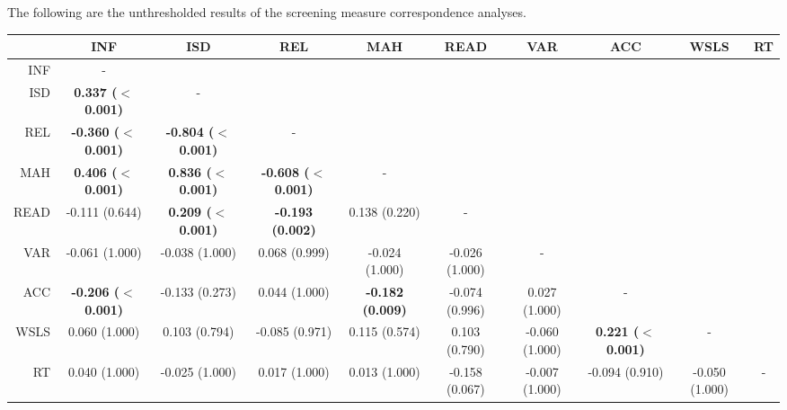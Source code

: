 \documentclass[a4paper,notitlepage,12pt]{article}
\begin{document}
\begin{refsection}[supp]
The following are the unthresholded results of the screening measure correspondence analyses.

\begin{table}[H]
    \centering
    \begin{adjustbox}{center}
    \tiny
    \begin{tabular}{rccccccccc}
        \toprule
        {} &      INF &      ISD &      REL &      MAH &    READ &     VAR &     ACC &   WSLS & RT \\
        \midrule
        INF  &                           - &                             &                             &                          &                 &                 &                            &                 &    \\
    ISD  &   \textbf{0.337 ($<$0.001)} &                           - &                             &                          &                 &                 &                            &                 &    \\
    REL  &  \textbf{-0.360 ($<$0.001)} &  \textbf{-0.804 ($<$0.001)} &                           - &                          &                 &                 &                            &                 &    \\
    MAH  &   \textbf{0.406 ($<$0.001)} &   \textbf{0.836 ($<$0.001)} &  \textbf{-0.608 ($<$0.001)} &                        - &                 &                 &                            &                 &    \\
    READ &              -0.111 (0.644) &   \textbf{0.209 ($<$0.001)} &     \textbf{-0.193 (0.002)} &            0.138 (0.220) &               - &                 &                            &                 &    \\
    VAR  &              -0.061 (1.000) &              -0.038 (1.000) &               0.068 (0.999) &           -0.024 (1.000) &  -0.026 (1.000) &               - &                            &                 &    \\
    ACC  &  \textbf{-0.206 ($<$0.001)} &              -0.133 (0.273) &               0.044 (1.000) &  \textbf{-0.182 (0.009)} &  -0.074 (0.996) &   0.027 (1.000) &                          - &                 &    \\
    WSLS &               0.060 (1.000) &               0.103 (0.794) &              -0.085 (0.971) &            0.115 (0.574) &   0.103 (0.790) &  -0.060 (1.000) &  \textbf{0.221 ($<$0.001)} &               - &    \\
    RT   &               0.040 (1.000) &              -0.025 (1.000) &               0.017 (1.000) &            0.013 (1.000) &  -0.158 (0.067) &  -0.007 (1.000) &             -0.094 (0.910) &  -0.050 (1.000) &  - \\

\end{tabular}
\end{adjustbox}
\end{table}
\end{refsection}
\end{document}
